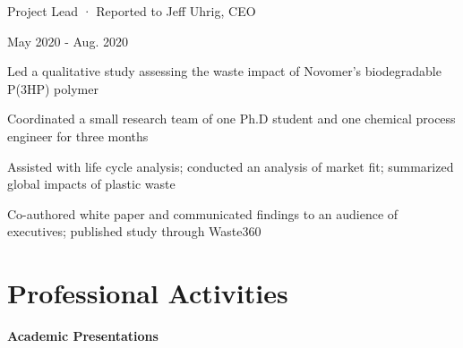 \documentclass[a4paper,20pt]{article}
\begin{document}
    \begin{minipage}{.75\linewidth} \begin{flushleft}
    		Project Lead · Reported to Jeff Uhrig, CEO
    	\end{flushleft} \end{minipage}
    \hfill 
    \begin{minipage}{.20\linewidth}\begin{flushright}
    	 May 2020 - Aug. 2020
    	\end{flushright}\end{minipage}
        \vspace{-5pt}
	\begin{description}[font=$\bullet$]
	\item{Led a qualitative study assessing the waste impact of Novomer’s biodegradable P(3HP) polymer}
        \vspace{-7pt}
        \item{Coordinated a small research team of one Ph.D student and one chemical process engineer for three months}
        \vspace{-7pt}
        \item{Assisted with life cycle analysis; conducted an analysis of market fit; summarized global impacts of plastic waste} 
        \vspace{-7pt}
        \item{Co-authored white paper and communicated findings to an audience of executives; published study through Waste360}
	\end{description}

\vspace{0pt}
\section{Professional Activities}
    \begin{minipage}{.75\linewidth} \begin{flushleft}
        \textbf{Academic Presentations}
    \end{flushleft} \end{minipage}
    
\end{document}
